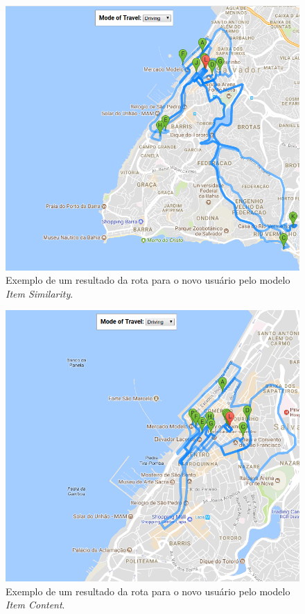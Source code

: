 \begin{figure}
    \centering
    \includegraphics[scale=0.6]{images/IS_pearson-newUser-route.png}
    \caption{Exemplo de um resultado da rota para o novo usuário pelo modelo \textit{Item Similarity}.}
    \label{fig:IS_pearson_newUser_route}
\end{figure}

\begin{figure}
    \centering
    \includegraphics[scale=0.6]{images/IC-loc_item-newUser-route.png}
    \caption{Exemplo de um resultado da rota para o novo usuário pelo modelo \textit{Item Content}.}
    \label{fig:IC-loc_item-newUser-route}
\end{figure}


